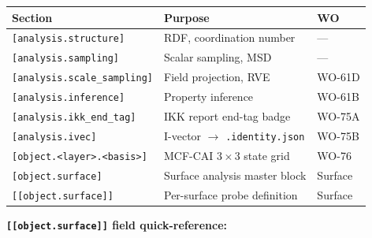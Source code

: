 \documentclass[11pt,a4paper]{article}
\begin{document}
\begin{center}\footnotesize
\begin{tabular}{@{}lll@{}}
\toprule
Section & Purpose & WO \\
\midrule
\texttt{[analysis.structure]}        & RDF, coordination number         & --- \\
\texttt{[analysis.sampling]}         & Scalar sampling, MSD             & --- \\
\texttt{[analysis.scale\_sampling]}  & Field projection, RVE            & WO-61D \\
\texttt{[analysis.inference]}        & Property inference               & WO-61B \\
\texttt{[analysis.ikk\_end\_tag]}    & IKK report end-tag badge         & WO-75A \\
\texttt{[analysis.ivec]}             & I-vector $\to$ \texttt{.identity.json} & WO-75B \\
\texttt{[object.<layer>.<basis>]}    & MCF-CAI $3\times3$ state grid    & WO-76 \\
\texttt{[object.surface]}            & Surface analysis master block    & Surface \\
\texttt{[[object.surface]]}          & Per-surface probe definition     & Surface \\
\bottomrule
\end{tabular}
\end{center}

\medskip
\textbf{\texttt{[[object.surface]]} field quick-reference:}
\end{document}
